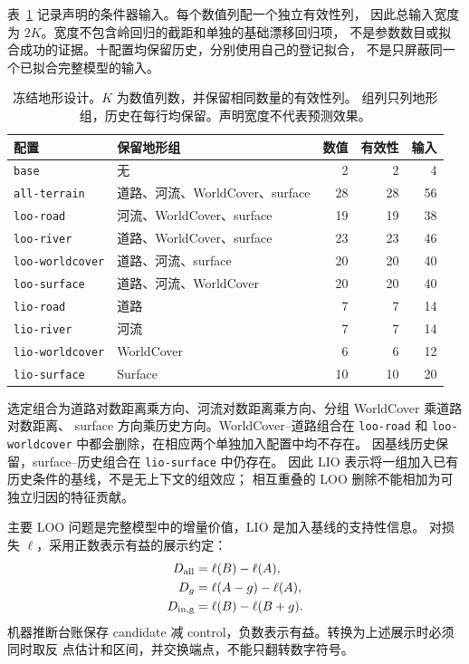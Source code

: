 \documentclass[UTF8,11pt]{ctexart}
\begin{document}
表~\ref{tab:terrain-design} 记录声明的条件器输入。每个数值列配一个独立有效性列，
因此总输入宽度为 \(2K\)。宽度不包含岭回归的截距和单独的基础漂移回归项，
不是参数数目或拟合成功的证据。十配置均保留历史，分别使用自己的登记拟合，
不是只屏蔽同一个已拟合完整模型的输入。

\begin{table}[htbp]
\centering\small
\caption{冻结地形设计。\(K\) 为数值列数，并保留相同数量的有效性列。
组列只列地形组，历史在每行均保留。声明宽度不代表预测效果。}
\label{tab:terrain-design}
\begin{tabular}{p{.24\linewidth}p{.35\linewidth}rrr}
\toprule
配置 & 保留地形组 & 数值 & 有效性 & 输入\\
\midrule
\texttt{base} & 无 & 2 & 2 & 4\\
\texttt{all-terrain} & 道路、河流、WorldCover、surface & 28 & 28 & 56\\
\texttt{loo-road} & 河流、WorldCover、surface & 19 & 19 & 38\\
\texttt{loo-river} & 道路、WorldCover、surface & 23 & 23 & 46\\
\texttt{loo-worldcover} & 道路、河流、surface & 20 & 20 & 40\\
\texttt{loo-surface} & 道路、河流、WorldCover & 20 & 20 & 40\\
\texttt{lio-road} & 道路 & 7 & 7 & 14\\
\texttt{lio-river} & 河流 & 7 & 7 & 14\\
\texttt{lio-worldcover} & WorldCover & 6 & 6 & 12\\
\texttt{lio-surface} & Surface & 10 & 10 & 20\\
\bottomrule
\end{tabular}
\end{table}

选定组合为道路对数距离乘方向、河流对数距离乘方向、分组 WorldCover 乘道路对数距离、
surface 方向乘历史方向。WorldCover--道路组合在 \texttt{loo-road} 和
\texttt{loo-worldcover} 中都会删除，在相应两个单独加入配置中均不存在。
因基线历史保留，surface--历史组合在 \texttt{lio-surface} 中仍存在。
因此 LIO 表示将一组加入已有历史条件的基线，不是无上下文的组效应；
相互重叠的 LOO 删除不能相加为可独立归因的特征贡献。

主要 LOO 问题是完整模型中的增量价值，LIO 是加入基线的支持性信息。
对损失 \(\ell\)，采用正数表示有益的展示约定：
\begin{align}
D_{\rm all}&=\ell(B)-\ell(A),\\
D_g&=\ell(A-g)-\ell(A),\\
D_{\rm in,g}&=\ell(B)-\ell(B+g).
\end{align}
机器推断台账保存 candidate 减 control，负数表示有益。转换为上述展示时必须同时取反
点估计和区间，并交换端点，不能只翻转数字符号。
\end{document}
